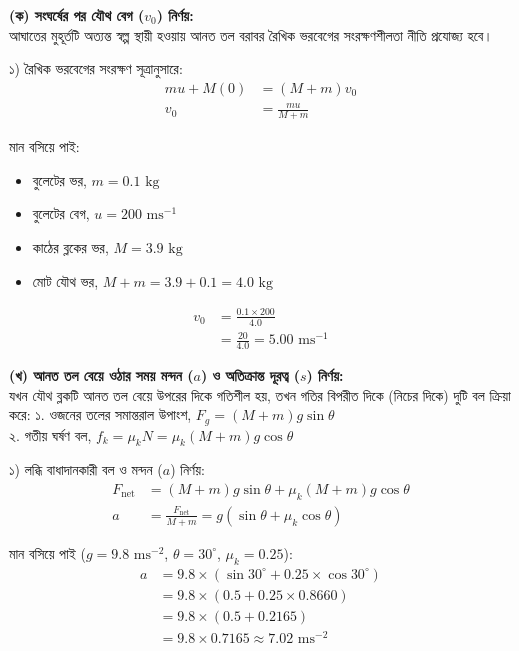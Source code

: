 \documentclass[12pt, a4paper]{article}
\begin{document}
\begin{tcolorbox}[solutionbox={সমাধান (Solution)}]
\noindent
\textbf{(ক) সংঘর্ষের পর যৌথ বেগ ($v_0$) নির্ণয়:} \\
আঘাতের মুহূর্তটি অত্যন্ত স্বল্প স্থায়ী হওয়ায় আনত তল বরাবর রৈখিক ভরবেগের সংরক্ষণশীলতা নীতি প্রযোজ্য হবে।

১) রৈখিক ভরবেগের সংরক্ষণ সূত্রানুসারে:
\begin{align*}
    m u + M (0) &= (M + m) v_0 \\
    v_0 &= \frac{m u}{M + m}
\end{align*}

মান বসিয়ে পাই:
\begin{itemize}
    \item বুলেটের ভর, $m = 0.1\text{ kg}$
    \item বুলেটের বেগ, $u = 200\text{ ms}^{-1}$
    \item কাঠের ব্লকের ভর, $M = 3.9\text{ kg}$
    \item মোট যৌথ ভর, $M + m = 3.9 + 0.1 = 4.0\text{ kg}$
\end{itemize}
\begin{align*}
    v_0 &= \frac{0.1 \times 200}{4.0} \\
        &= \frac{20}{4.0} = \mathbf{5.00}\text{ ms}^{-1}
\end{align*}

\vspace{0.5em}
\noindent\textbf{(খ) আনত তল বেয়ে ওঠার সময় মন্দন ($a$) ও অতিক্রান্ত দূরত্ব ($s$) নির্ণয়:} \\
যখন যৌথ ব্লকটি আনত তল বেয়ে উপরের দিকে গতিশীল হয়, তখন গতির বিপরীত দিকে (নিচের দিকে) দুটি বল ক্রিয়া করে: 
১. ওজনের তলের সমান্তরাল উপাংশ, $F_g = (M + m) g \sin\theta$ \\
২. গতীয় ঘর্ষণ বল, $f_k = \mu_k N = \mu_k (M + m) g \cos\theta$

১) লব্ধি বাধাদানকারী বল ও মন্দন ($a$) নির্ণয়:
\begin{align*}
    F_{\text{net}} &= (M + m) g \sin\theta + \mu_k (M + m) g \cos\theta \\
    a &= \frac{F_{\text{net}}}{M + m} = g (\sin\theta + \mu_k \cos\theta)
\end{align*}

মান বসিয়ে পাই ($g = 9.8\text{ ms}^{-2}$, $\theta = 30^\circ$, $\mu_k = 0.25$):
\begin{align*}
    a &= 9.8 \times (\sin 30^\circ + 0.25 \times \cos 30^\circ) \\
      &= 9.8 \times (0.5 + 0.25 \times 0.8660) \\
      &= 9.8 \times (0.5 + 0.2165) \\
      &= 9.8 \times 0.7165 \approx \mathbf{7.02}\text{ ms}^{-2}
\end{align*}


\end{tcolorbox}
\end{document}
